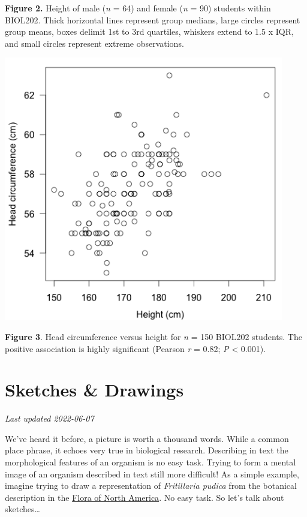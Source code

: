 \documentclass[
]{book}
\begin{document}
\textbf{Figure 2.} Height of male (\emph{n} = 64) and female (\emph{n} = 90) students within BIOL202. Thick horizontal lines represent group medians, large circles represent group means, boxes delimit 1st to 3rd quartiles, whiskers extend to 1.5 x IQR, and small circles represent extreme observations.

\includegraphics{images/FT_fig-3.png}

\textbf{Figure 3}. Head circumference versus height for \emph{n} = 150 BIOL202 students. The positive association is highly significant (Pearson \emph{r} = 0.82; \emph{P} \textless{} 0.001).

\hypertarget{sketches-drawings}{%
\chapter{Sketches \& Drawings}\label{sketches-drawings}}

\emph{Last updated 2022-06-07}

We've heard it before, a picture is worth a thousand words. While a common place phrase, it echoes very true in biological research. Describing in text the morphological features of an organism is no easy task. Trying to form a mental image of an organism described in text still more difficult! As a simple example, imagine trying to draw a representation of \emph{Fritillaria pudica} from the botanical description in the \href{http://www.efloras.org/florataxon.aspx?flora_id=1\&taxon_id=242101628}{Flora of North America}. No easy task. So let's talk about sketches\ldots{}
\end{document}
